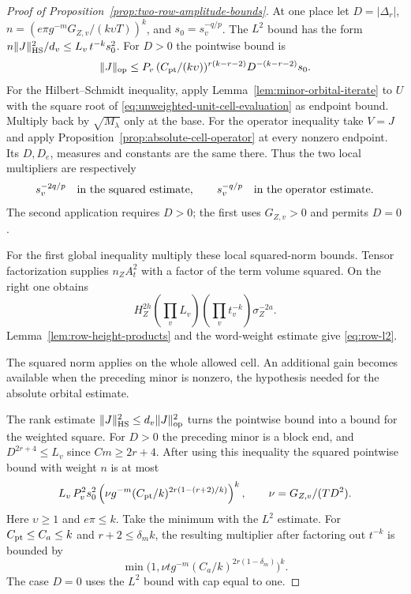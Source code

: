\begin{proof}[Proof of Proposition~\ref{prop:two-row-amplitude-bounds}]
At one place let \(D=|\Delta_r|\),
\(n=(e\pi g^{-m}G_{Z,v}/(k\upsilon T))^k\), and
\(s_0=s_v^{-q/p}\). The \(L^2\) bound has the form
\(n\|J\|_{\rm HS}^2/d_v\le L_v\,t^{-k}s_0^2\).
For \(D>0\) the pointwise bound is
\[
 \|J\|_{\rm op}\le
   P_v\,(C_{\rm pt}/(k\upsilon))^{r(k-r-2)}D^{-(k-r-2)}s_0.
\]
For the Hilbert--Schmidt inequality, apply
Lemma~\ref{lem:minor-orbital-iterate} to \(U\) with the square
root of \eqref{eq:unweighted-unit-cell-evaluation} as endpoint
bound. Multiply back by \(\sqrt{M_\lambda}\) only at the base.
For the operator inequality take \(V=J\) and apply
Proposition~\ref{prop:absolute-cell-operator} at every nonzero
endpoint. Its \(D,D_e\), measures and constants are the same
there. Thus the two local multipliers are respectively
\[
   s_v^{-2q/p}\quad\hbox{in the squared estimate},\qquad
   s_v^{-q/p}\quad\hbox{in the operator estimate}.
\]
The second application requires \(D>0\); the first uses
\(G_{Z,v}>0\) and permits \(D=0\).

For the first global inequality multiply these local squared-norm
bounds. Tensor factorization supplies \(n_Z A_t^2\) with a factor
of the term volume squared. On the right one obtains
\[
 H_Z^{2h}\left(\prod_v L_v\right)
          \left(\prod_v t_v^{-k}\right)\sigma_Z^{-2a}.
\]
Lemma~\ref{lem:row-height-products} and the word-weight estimate give \eqref{eq:row-l2}.


The squared norm applies on the whole allowed cell. An additional gain becomes available when the preceding minor is nonzero, the hypothesis needed for the absolute orbital estimate.

The rank estimate \(\|J\|_{\rm HS}^2\le d_v\|J\|_{\rm op}^2\)
turns the pointwise bound into a bound for the weighted square.
For \(D>0\) the preceding minor is a block end, and
\(D^{2r+4}\le L_v\) since \(Cm\ge2r+4\).
After using this inequality the squared pointwise bound
with weight \(n\) is at most
\[
 L_v\,P_v^2s_0^2
 \left(\nu g^{-m}(C_{\rm pt}/k)^{2r(1-(r+2)/k)}\right)^k,
 \qquad \nu=G_{Z,v}/(TD^2).
\]
Here \(\upsilon\ge1\) and \(e\pi\le k\).
Take the minimum with the \(L^2\) estimate. For \(C_{\rm pt}\le C_a\le k\)
and \(r+2\le\delta_m k\), the resulting multiplier after
factoring out \(t^{-k}\) is bounded by
\[
 \min\bigl(1,\nu t g^{-m}(C_a/k)^{2r(1-\delta_m)}\bigr)^k.
\]
The case \(D=0\) uses the \(L^2\) bound with cap equal to one.


\end{proof}
